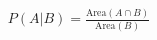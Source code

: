 \documentclass[preview]{standalone}
\begin{document}
\begin{align*}
P(A|B) = \frac{\text{Area}(A \cap B)}{\text{Area}(B)}
\end{align*}
\end{document}
